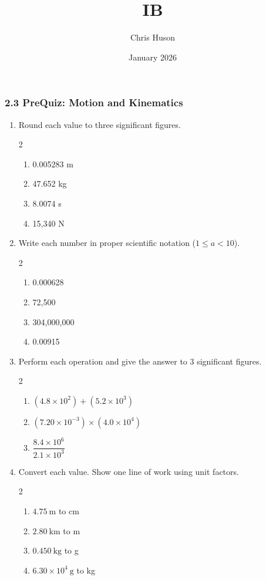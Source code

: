 \documentclass[12pt, twoside]{article}
\title{IB}
\author{Chris Huson}
\date{January 2026}
\begin{document}
\subsubsection*{2.3 PreQuiz: Motion and Kinematics}

\begin{enumerate}[itemsep=0.75cm]

\item Round each value to three significant figures.
  \begin{multicols}{2}
  \begin{enumerate}[itemsep=0.75cm]
    \item 0.005283 m
    \item 47.652 kg
    \item 8.0074 s
    \item 15,340 N
  \end{enumerate}
  \end{multicols}
  \vspace{0.75cm}

\item Write each number in proper scientific notation ($1 \le a < 10$).
  \begin{multicols}{2}
  \begin{enumerate}[itemsep=0.75cm]
    \item 0.000628
    \item 72,500
    \item 304,000,000
    \item 0.00915
  \end{enumerate}
  \end{multicols}
  \vspace{0.75cm}

\item Perform each operation and give the answer to 3 significant figures.
  \begin{multicols}{2}
  \begin{enumerate}[itemsep=1.25cm]
    \item $(4.8\times10^{2}) + (5.2\times10^{3})$
    \item $(7.20\times10^{-3}) \times (4.0\times10^{4})$
    \item $\dfrac{8.4\times10^{6}}{2.1\times10^{3}}$
  \end{enumerate}
  \end{multicols}
  \vspace{1cm}

\item Convert each value. Show one line of work using unit factors.
  \begin{multicols}{2}
  \begin{enumerate}[itemsep=2cm]
    \item $4.75~\text{m}$ to cm
    \item $2.80~\text{km}$ to m
    \item $0.450~\text{kg}$ to g
    \item $6.30\times10^{4}~\text{g}$ to kg
  \end{enumerate}
  \end{multicols}
  \vspace{1cm}


\end{enumerate}
\end{document}

